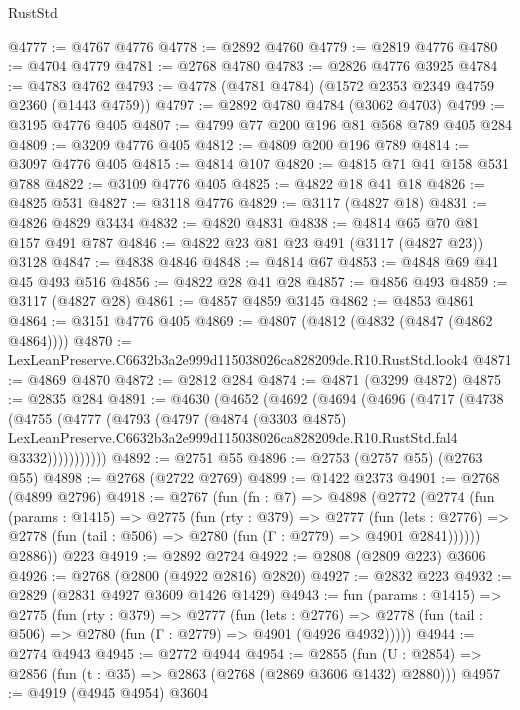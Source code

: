 \begin{lexlean}{RustStd}
\begin{coremodule}
@4777 := @4767 @4776
@4778 := @2892 @4760
@4779 := @2819 @4776
@4780 := @4704 @4779
@4781 := @2768 @4780
@4783 := @2826 @4776 @3925
@4784 := @4783 @4762
@4793 := @4778 (@4781 @4784) (@1572 @2353 @2349 @4759 @2360 (@1443 @4759))
@4797 := @2892 @4780 @4784 (@3062 @4703)
@4799 := @3195 @4776 @405
@4807 := @4799 @77 @200 @196 @81 @568 @789 @405 @284
@4809 := @3209 @4776 @405
@4812 := @4809 @200 @196 @789
@4814 := @3097 @4776 @405
@4815 := @4814 @107
@4820 := @4815 @71 @41 @158 @531 @788
@4822 := @3109 @4776 @405
@4825 := @4822 @18 @41 @18
@4826 := @4825 @531
@4827 := @3118 @4776
@4829 := @3117 (@4827 @18)
@4831 := @4826 @4829 @3434
@4832 := @4820 @4831
@4838 := @4814 @65 @70 @81 @157 @491 @787
@4846 := @4822 @23 @81 @23 @491 (@3117 (@4827 @23)) @3128
@4847 := @4838 @4846
@4848 := @4814 @67
@4853 := @4848 @69 @41 @45 @493 @516
@4856 := @4822 @28 @41 @28
@4857 := @4856 @493
@4859 := @3117 (@4827 @28)
@4861 := @4857 @4859 @3145
@4862 := @4853 @4861
@4864 := @3151 @4776 @405
@4869 := @4807 (@4812 (@4832 (@4847 (@4862 @4864))))
@4870 := LexLeanPreserve.C6632b3a2e999d115038026ca828209de.R10.RustStd.look4
@4871 := @4869 @4870
@4872 := @2812 @284
@4874 := @4871 (@3299 @4872)
@4875 := @2835 @284
@4891 := @4630
    (@4652
      (@4692
        (@4694
          (@4696
            (@4717
              (@4738
                (@4755
                  (@4777
                    (@4793
                      (@4797
                        (@4874
                          (@3303 @4875)
                          LexLeanPreserve.C6632b3a2e999d115038026ca828209de.R10.RustStd.fal4
                          @3332)))))))))))
@4892 := @2751 @55
@4896 := @2753 (@2757 @55) (@2763 @55)
@4898 := @2768 (@2722 @2769)
@4899 := @1422 @2373
@4901 := @2768 (@4899 @2796)
@4918 := @2767
    (fun (fn : @7) =>
    @4898
      (@2772
        (@2774
          (fun (params : @1415) =>
          @2775
            (fun (rty : @379) =>
            @2777
              (fun (lets : @2776) =>
              @2778 (fun (tail : @506) => @2780 (fun (Γ : @2779) => @4901 @2841))))))
        @2886))
    @223
@4919 := @2892 @2724
@4922 := @2808 (@2809 @223) @3606
@4926 := @2768 (@2800 (@4922 @2816) @2820)
@4927 := @2832 @223
@4932 := @2829 (@2831 @4927 @3609 @1426 @1429)
@4943 := fun (params : @1415) =>
  @2775
    (fun (rty : @379) =>
    @2777
      (fun (lets : @2776) =>
      @2778 (fun (tail : @506) => @2780 (fun (Γ : @2779) => @4901 (@4926 @4932)))))
@4944 := @2774 @4943
@4945 := @2772 @4944
@4954 := @2855 (fun (U : @2854) => @2856 (fun (t : @35) => @2863 (@2768 (@2869 @3606 @1432) @2880)))
@4957 := @4919 (@4945 @4954) @3604

\end{coremodule}
\end{lexlean}
